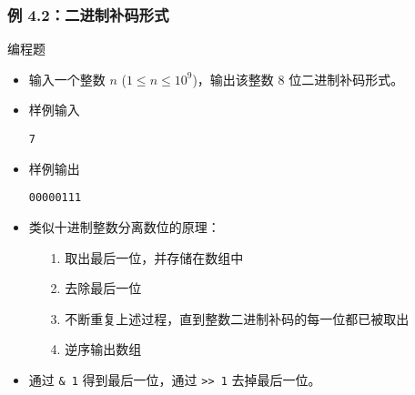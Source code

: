 \begin{frame}[fragile]
    \frametitle{例 4.2：二进制补码形式}

     {
        \begin{exampleblock}{编程题}
            \begin{itemize}
                \item 输入一个整数 $n$ ($1 \le n \le 10^9$)，输出该整数 $8$ 位二进制补码形式。
                    
                \item 样例输入
    
                    \lstinline|7|
    
                \item 样例输出
                
                    \lstinline|00000111|
    
            \end{itemize}
        \end{exampleblock}
    }

     {
        \begin{itemize}
            \item<2-> 类似十进制整数分离数位的原理：
            
            \begin{enumerate}
                \item[1.] 取出最后一位，并存储在数组中
                \item[2.] 去除最后一位 
                \item[3.] 不断重复上述过程，直到整数二进制补码的每一位都已被取出
                \item[4.] 逆序输出数组
            \end{enumerate}

            \item<3> 通过 \lstinline|& 1| 得到最后一位，通过 \lstinline|>> 1| 去掉最后一位。
        \end{itemize}
    }
    
     {
        
    } 

\end{frame}

